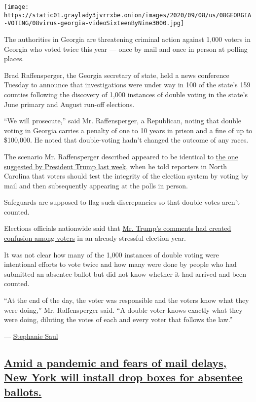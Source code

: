 \texttt{[image: https://static01.graylady3jvrrxbe.onion/images/2020/09/08/us/08GEORGIA-VOTING/08virus-georgia-videoSixteenByNine3000.jpg]}

The authorities in Georgia are threatening criminal action against 1,000
voters in Georgia who voted twice this year --- once by mail and once in
person at polling places.

Brad Raffensperger, the Georgia secretary of state, held a news
conference Tuesday to announce that investigations were under way in 100
of the state's 159 counties following the discovery of 1,000 instances
of double voting in the state's June primary and August run-off
elections.

``We will prosecute,'' said Mr. Raffensperger, a Republican, noting that
double voting in Georgia carries a penalty of one to 10 years in prison
and a fine of up to \$100,000. He noted that double-voting hadn't
changed the outcome of any races.

The scenario Mr. Raffensperger described appeared to be identical to
\href{https://www.nytimes3xbfgragh.onion/2020/09/02/us/politics/trump-people-vote-twice.html}{the
one suggested by President Trump last week}, when he told reporters in
North Carolina that voters should test the integrity of the election
system by voting by mail and then subsequently appearing at the polls in
person.

Safeguards are supposed to flag such discrepancies so that double votes
aren't counted.

Elections officials nationwide said that
\href{https://www.nytimes3xbfgragh.onion/2020/09/03/us/politics/people-voting-twice-trump.html}{Mr.
Trump's comments had created confusion among voters} in an already
stressful election year.

It was not clear how many of the 1,000 instances of double voting were
intentional efforts to vote twice and how many were done by people who
had submitted an absentee ballot but did not know whether it had arrived
and been counted.

``At the end of the day, the voter was responsible and the voters know
what they were doing,'' Mr. Raffensperger said. ``A double voter knows
exactly what they were doing, diluting the votes of each and every voter
that follows the law.''

---
\href{https://www.nytimes3xbfgragh.onion/by/stephanie-saul}{Stephanie
Saul}

\hypertarget{amid-a-pandemic-and-fears-of-mail-delays-new-york-will-install-drop-boxes-for-absentee-ballots}{%
\subsection{\texorpdfstring{\protect\hyperlink{amid-a-pandemic-and-fears-of-mail-delays-new-york-will-install-drop-boxes-for-absentee-ballots}{Amid
a pandemic and fears of mail delays, New York will install drop boxes
for absentee
ballots.}}{Amid a pandemic and fears of mail delays, New York will install drop boxes for absentee ballots.}}\label{amid-a-pandemic-and-fears-of-mail-delays-new-york-will-install-drop-boxes-for-absentee-ballots}}

